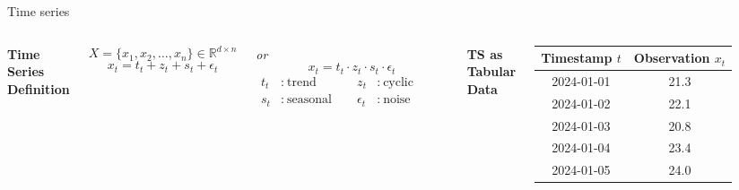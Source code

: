 \documentclass[t,aspectratio=169,svgnames]{beamer}
\begin{document}
\begin{frame}{Time series}

\begin{columns}[T]


\textbf{Time Series Definition}

\vspace{0.2cm}

\[
X = \{x_1, x_2, \dots, x_n\} \in \mathbb{R}^{d \times n}
\]
\[
x_t = t_t + z_t + s_t + \epsilon_t
\]

\centering
\textit{or}
\[
x_t = t_t \cdot z_t \cdot s_t \cdot \epsilon_t
\]
\begin{align*}
t_t &:\ \text{trend component} & z_t &:\ \text{cyclic component} \\
s_t &:\ \text{seasonal component} & \epsilon_t &:\ \text{noise component}\\
\end{align*}


\centering
\textbf{TS as Tabular Data}

\vspace{0.3cm}

\begin{tabular}{cc}
\toprule
Timestamp $t$ & Observation $x_t$ \\
\midrule
2024-01-01 & 21.3 \\
2024-01-02 & 22.1 \\
2024-01-03 & 20.8 \\
2024-01-04 & 23.4 \\
2024-01-05 & 24.0 \\
\bottomrule
\end{tabular}

\end{columns}
\end{frame}
\end{document}
